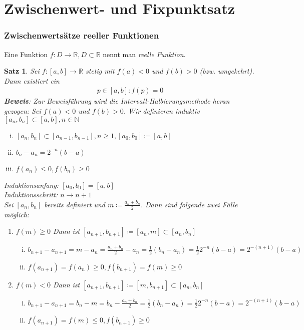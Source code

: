 \documentclass[ngerman,titlepage,twoside, parskip=half*]{scrreprt}
\newcommand*{\N}{\mathbb{N}}
\newcommand*{\R}{\mathbb{R}}
\theoremstyle{break}
\newtheorem{theorem}{Satz}[section]
\theoremstyle{nonumberbreak}
\begin{document}
\section{Zwischenwert- und Fixpunktsatz}
\subsubsection{Zwischenwertsätze reeller Funktionen}
Eine Funktion $f\colon D\rightarrow\R , D\subset \R$ nennt man \emph{reelle Funktion}.
\begin{theorem}
\label{satz:zws}
Sei $f\colon[a,b]\rightarrow \R$ stetig mit $f(a)<0$ und $f(b)>0$ (bzw. umgekehrt). Dann existiert ein
\begin{gather*}p\in[a,b]\colon f(p)=0\end{gather*}
\textbf{Beweis}: Zur Beweisführung wird die Intervall-Halbierungsmethode heran gezogen:
Sei $f(a)<0$ und $f(b)>0$. Wir definieren induktiv $[a_n,b_n]\subset [a,b], n\in \N$
\begin{enumerate}[(i)]
  \item $[a_n,b_n]\subset [a_{n-1},b_{n-1}], n\geq 1, [a_0,b_0]\coloneqq[a,b]$
  \item $b_n-a_n=2^{-n}(b-a)$
  \item $f(a_n)\leq 0, f(b_n)\geq 0$
\end{enumerate}
Induktionsanfang: $[a_0,b_0]=[a,b]$\\
Induktionsschritt: $n\rightarrow n+1$\\
Sei $[a_n,b_n]$ bereits definiert und $m\coloneqq\frac{a_n+b_n}{2}$. Dann sind folgende zwei Fälle möglich:
\begin{enumerate}[1. F{a}ll]
  \item $f(m)\geq 0$ Dann ist $[a_{n+1},b_{n+1}]\coloneqq[a_n,m]\subset [a_n,b_n]$
    \begin{enumerate}[(i)]
      \item $b_{n+1}-a_{n+1}=m-a_n=\frac{a_n+b_n}{2}-a_n=\frac{1}{2}(b_n-a_n)=\frac{1}{2}2^{-n}(b-a)=2^{-(n+1)}(b-a)$
      \item $f(a_{n+1})=f(a_n)\geq 0, f(b_{n+1})=f(m)\geq 0$
    \end{enumerate}
  \item $f(m)<0$ Dann ist $[a_{n+1},b_{n+1}]\coloneqq[m,b_{n+1}]\subset [a_n,b_n]$
    \begin{enumerate}[(i)]
      \item $b_{n+1}-a_{n+1}=b_n-m=b_n-\frac{a_n+b_n}{2}=\frac{1}{2}(b_n-a_n)=\frac{1}{2}2^{-n}(b-a)=2^{-(n+1)}(b-a)$
      \item $f(a_{n+1})=f(m)\leq 0, f(b_{n+1})\geq 0$

\end{enumerate}
\end{enumerate}
\end{theorem}
\end{document}
